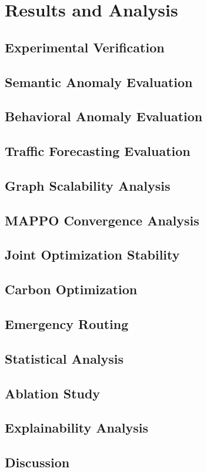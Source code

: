 
\section{Results and Analysis}
\subsection{Experimental Verification}
\subsection{Semantic Anomaly Evaluation}
\subsection{Behavioral Anomaly Evaluation}
\subsection{Traffic Forecasting Evaluation}
\subsection{Graph Scalability Analysis}
\subsection{MAPPO Convergence Analysis}
\subsection{Joint Optimization Stability}
\subsection{Carbon Optimization}
\subsection{Emergency Routing}
\subsection{Statistical Analysis}
\subsection{Ablation Study}
\subsection{Explainability Analysis}
\subsection{Discussion}
